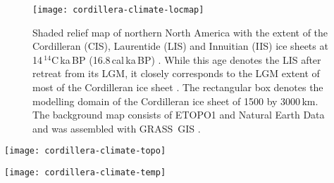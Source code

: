 
\begin{figure}[t]
	\vspace*{2mm}
	\begin{center}
		\texttt{[image: cordillera-climate-locmap]}
	\end{center}
	\caption{Shaded relief map of northern North America with the extent of the Cordilleran (CIS), Laurentide (LIS) and Innuitian (IIS) ice sheets at 14\,$^{14}$C\,ka\,BP (16.8\,cal\,ka\,BP) \citep{dyke-2004}. While this age denotes the LIS after retreat from its LGM, it closely corresponds to the LGM extent of most of the Cordilleran ice sheet \citep{porter-swanson-1998,dyke-2004,stroeven-etal-2010}. The rectangular box denotes the modelling domain of the Cordilleran ice sheet of 1500 by 3000\,km. The background map consists of ETOPO1 \citep{data:etopo1} and Natural Earth Data \citep{data:naturalearth} and was assembled with GRASS~GIS \citep{soft:grass}.}
	\label{fig:locmap}
\end{figure}

\begin{figure*}[t]
	\vspace*{2mm}
	\begin{center}
		\texttt{[image: cordillera-climate-topo]}
	\end{center}
	\caption{Topography maps from WorldClim \citep{data:worldclim}, ERA-Interim reanalysis \citep{data:erai}, North American Regional Reanalysis \citep[NARR;][]{data:narr}, ETOPO1 \citep{data:etopo1}, Climate Forecast System Reanalysis \citep[CFSR;][]{data:cfsr}, and NCEP/NCAR reanalysis \citep{data:ncar}. Whereas ETOPO1 is used as basal topography for the ice sheet model, all other data are used as a reference for temperature lapse-rate corrections. Fig.~\ref{fig:topo}-\ref{fig:durationstack} are drawn using Matplotlib \citep{soft:mpl}.}
	\label{fig:topo}
\end{figure*}

\begin{figure*}[t]
	\vspace*{2mm}
	\begin{center}
		\texttt{[image: cordillera-climate-temp]}
	\end{center}
	\caption{Summer (JJA) and winter (DJF) temperature maps from WorldClim \citep{data:worldclim}, and summer (JJA) temperature maps from ERA-Interim reanalysis \citep{data:erai}, North American Regional Reanalysis \citep[NARR;][]{data:narr}, Climate Forecast System Reanalysis \citep[CFSR;][]{data:cfsr}, and NCEP/NCAR reanalysis \citep{data:ncar} climatologies.}
	\label{fig:temp}
\end{figure*}

